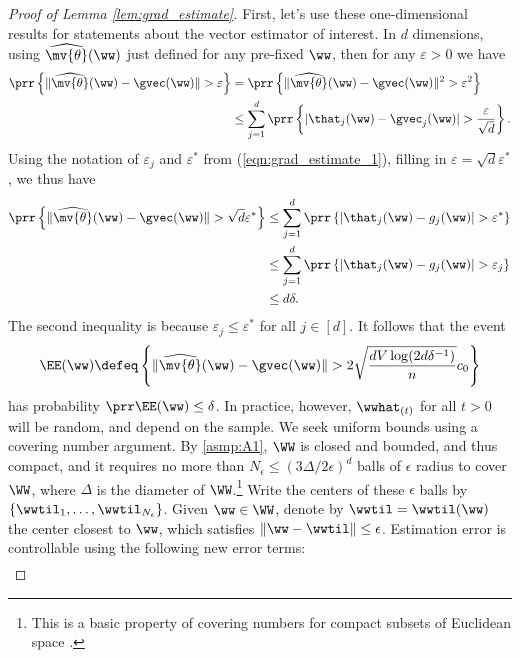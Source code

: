 \documentclass[11pt,oneside]{article}
\theoremstyle{definition} \newtheorem{defn}{Definition}       %
\theoremstyle{plain} \newtheorem{prop}[defn]{Proposition}           %
\theoremstyle{plain} \newtheorem{thm}[defn]{Theorem}                %
\theoremstyle{plain} \newtheorem{lem}[defn]{Lemma}                  %
\theoremstyle{plain} \newtheorem{cor}[defn]{Corollary}              %
\theoremstyle{remark} \newtheorem{rmk}[defn]{Remark}                %
\theoremstyle{remark} \newtheorem{ex}[defn]{Example}                %
\begin{document}
\begin{proof}[Proof of Lemma \ref{lem:grad_estimate}]
First, let's use these one-dimensional results for statements about the vector estimator of interest. In $d$ dimensions, using $\widehat{\mv{\theta}}(\ww)$ just defined for any pre-fixed $\ww$, then for any $\varepsilon > 0$ we have
%
\begin{align*}
\prr\left\{ \|\widehat{\mv{\theta}}(\ww)-\gvec(\ww)\| > \varepsilon \right\} & = \prr\left\{ \|\widehat{\mv{\theta}}(\ww)-\gvec(\ww)\|^{2} > \varepsilon^{2} \right\}\\
& \leq \sum_{j=1}^{d} \prr\left\{ |\that_{j}(\ww) - \gvec_{j}(\ww)| > \frac{\varepsilon}{\sqrt{d}} \right\}.
\end{align*}
%
Using the notation of $\varepsilon_{j}$ and $\varepsilon^{\ast}$ from (\ref{eqn:grad_estimate_1}), filling in $\varepsilon = \sqrt{d}\varepsilon^{\ast}$, we thus have
%
\begin{align*}
\prr\left\{ \|\widehat{\mv{\theta}}(\ww)-\gvec(\ww)\| > \sqrt{d}\varepsilon^{\ast} \right\} & \leq \sum_{j=1}^{d}\prr\left\{ |\that_{j}(\ww) - g_{j}(\ww)| > \varepsilon^{\ast} \right\}\\
& \leq \sum_{j=1}^{d}\prr\left\{ |\that_{j}(\ww) - g_{j}(\ww)| > \varepsilon_{j} \right\}\\
& \leq d\delta.
\end{align*}
%
The second inequality is because $\varepsilon_{j} \leq \varepsilon^{\ast}$ for all $j \in [d]$. It follows that the event
%
\begin{align*}
\EE(\ww) \defeq \left\{ \|\widehat{\mv{\theta}}(\ww)-\gvec(\ww)\| > 2 \sqrt{\frac{dV\log(2d\delta^{-1})}{n}} c_{0} \right\}
\end{align*}
%
has probability $\prr \EE(\ww) \leq \delta$. In practice, however, $\wwhat_{(t)}$ for all $t > 0$ will be random, and depend on the sample. We seek uniform bounds using a covering number argument. By \ref{asmp:A1}, $\WW$ is closed and bounded, and thus compact, and it requires no more than $N_{\epsilon} \leq (3\Delta/2\epsilon)^{d}$ balls of $\epsilon$ radius to cover $\WW$, where $\Delta$ is the diameter of $\WW$.\footnote{This is a basic property of covering numbers for compact subsets of Euclidean space \citep{kolmogorov1993SelectWorks3}.} Write the centers of these $\epsilon$ balls by $\{\wwtil_{1},\ldots,\wwtil_{N_{\epsilon}}\}$. Given $\ww \in \WW$, denote by $\wwtil = \wwtil(\ww)$ the center closest to $\ww$, which satisfies $\|\ww - \wwtil\| \leq \epsilon$. Estimation error is controllable using the following new error terms:
%
\begin{align}\label{eqn:ineq_3errors}

\end{align}
\end{proof}
\end{document}
